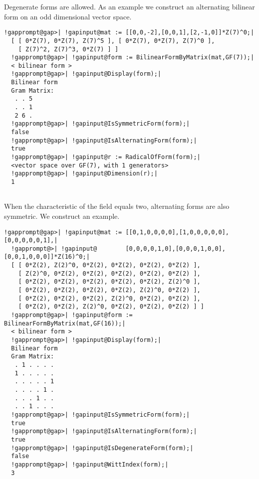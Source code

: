\documentclass[a4paper,11pt]{report}
\begin{document}
{{{\begin{Verbatim}[commandchars=!@|,fontsize=\small,frame=single,label=Example]
\end{Verbatim}
 

 Degenerate forms are allowed. As an example we construct an alternating
bilinear form on an odd dimensional vector space. 
\begin{Verbatim}[commandchars=!@|,fontsize=\small,frame=single,label=Example]
  !gapprompt@gap>| !gapinput@mat := [[0,0,-2],[0,0,1],[2,-1,0]]*Z(7)^0;|
  [ [ 0*Z(7), 0*Z(7), Z(7)^5 ], [ 0*Z(7), 0*Z(7), Z(7)^0 ], 
    [ Z(7)^2, Z(7)^3, 0*Z(7) ] ]
  !gapprompt@gap>| !gapinput@form := BilinearFormByMatrix(mat,GF(7));|
  < bilinear form >
  !gapprompt@gap>| !gapinput@Display(form);|
  Bilinear form
  Gram Matrix:
   . . 5
   . . 1
   2 6 .
  !gapprompt@gap>| !gapinput@IsSymmetricForm(form);|
  false
  !gapprompt@gap>| !gapinput@IsAlternatingForm(form);|
  true
  !gapprompt@gap>| !gapinput@r := RadicalOfForm(form);|
  <vector space over GF(7), with 1 generators>
  !gapprompt@gap>| !gapinput@Dimension(r);|
  1
   
\end{Verbatim}
 When the characteristic of the field equals two, alternating forms are also
symmetric. We construct an example. 
\begin{Verbatim}[commandchars=!@|,fontsize=\small,frame=single,label=Example]
  !gapprompt@gap>| !gapinput@mat := [[0,1,0,0,0,0],[1,0,0,0,0,0],[0,0,0,0,0,1],|
  !gapprompt@>| !gapinput@        [0,0,0,0,1,0],[0,0,0,1,0,0],[0,0,1,0,0,0]]*Z(16)^0;|
  [ [ 0*Z(2), Z(2)^0, 0*Z(2), 0*Z(2), 0*Z(2), 0*Z(2) ], 
    [ Z(2)^0, 0*Z(2), 0*Z(2), 0*Z(2), 0*Z(2), 0*Z(2) ], 
    [ 0*Z(2), 0*Z(2), 0*Z(2), 0*Z(2), 0*Z(2), Z(2)^0 ], 
    [ 0*Z(2), 0*Z(2), 0*Z(2), 0*Z(2), Z(2)^0, 0*Z(2) ], 
    [ 0*Z(2), 0*Z(2), 0*Z(2), Z(2)^0, 0*Z(2), 0*Z(2) ], 
    [ 0*Z(2), 0*Z(2), Z(2)^0, 0*Z(2), 0*Z(2), 0*Z(2) ] ]
  !gapprompt@gap>| !gapinput@form := BilinearFormByMatrix(mat,GF(16));|
  < bilinear form >
  !gapprompt@gap>| !gapinput@Display(form);|
  Bilinear form
  Gram Matrix:
   . 1 . . . .
   1 . . . . .
   . . . . . 1
   . . . . 1 .
   . . . 1 . .
   . . 1 . . .
  !gapprompt@gap>| !gapinput@IsSymmetricForm(form);|
  true
  !gapprompt@gap>| !gapinput@IsAlternatingForm(form);|
  true
  !gapprompt@gap>| !gapinput@IsDegenerateForm(form);|
  false
  !gapprompt@gap>| !gapinput@WittIndex(form);|
  3
   

\end{Verbatim}}}}
\end{document}
